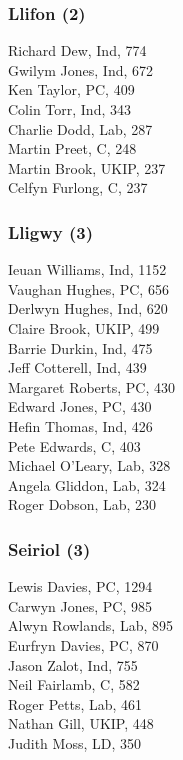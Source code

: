 \documentclass[a4paper,openany,10pt]{book}
\begin{document}
\subsubsection*{Llifon (2)}



Richard Dew, Ind, 774\\
Gwilym Jones, Ind, 672\\
Ken Taylor, PC, 409\\
Colin Torr, Ind, 343\\
Charlie Dodd, Lab, 287\\
Martin Preet, C, 248\\
Martin Brook, UKIP, 237\\
Celfyn Furlong, C, 237\\


\subsubsection*{Lligwy (3)}



Ieuan Williams, Ind, 1152\\
Vaughan Hughes, PC, 656\\
Derlwyn Hughes, Ind, 620\\
Claire Brook, UKIP, 499\\
Barrie Durkin, Ind, 475\\
Jeff Cotterell, Ind, 439\\
Margaret Roberts, PC, 430\\
Edward Jones, PC, 430\\
Hefin Thomas, Ind, 426\\
Pete Edwards, C, 403\\
Michael O'Leary, Lab, 328\\
Angela Gliddon, Lab, 324\\
Roger Dobson, Lab, 230\\


\subsubsection*{Seiriol (3)}



Lewis Davies, PC, 1294\\
Carwyn Jones, PC, 985\\
Alwyn Rowlands, Lab, 895\\
Eurfryn Davies, PC, 870\\
Jason Zalot, Ind, 755\\
Neil Fairlamb, C, 582\\
Roger Petts, Lab, 461\\
Nathan Gill, UKIP, 448\\
Judith Moss, LD, 350\\
\end{document}
